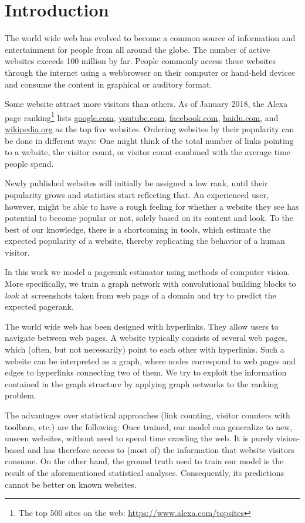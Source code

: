 \section{Introduction}
\label{section:introduction}

The world wide web has evolved to become a common source of information and entertainment for people from all around the globe. The number of active websites exceeds 100 million by far. People commonly access these websites through the internet using a webbrowser on their computer or hand-held devices and consume the content in graphical or auditory format.

Some website attract more visitors than others. As of January 2018, the Alexa page ranking\footnote{The top 500 sites on the web: \url{https://www.alexa.com/topsites}} lists \url{google.com}, \url{youtube.com}, \url{facebook.com}, \url{baidu.com}, and \url{wikipedia.org} as the top five websites. Ordering websites by their popularity can be done in different ways: One might think of the total number of links pointing to a website, the visitor count, or visitor count combined with the average time people spend.

Newly published websites will initially be assigned a low rank, until their popularity grows and statistics start reflecting that. An experienced user, however, might be able to have a rough feeling for whether a website they see has potential to become popular or not, solely based on its content and look. To the best of our knowledge, there is a shortcoming in tools, which estimate the expected popularity of a website, thereby replicating the behavior of a human visitor.

In this work we model a pagerank estimator using methods of computer vision. More specifically, we train a graph network with convolutional building blocks to \textit{look} at screenshots taken from web page of a domain and try to predict the expected pagerank.

The world wide web has been designed with hyperlinks. They allow users to navigate between web pages. A website typically consists of several web pages, which (often, but not necessarily) point to each other with hyperlinks. Such a website can be interpreted as a graph, where nodes correspond to web pages and edges to hyperlinks connecting two of them. We try to exploit the information contained in the graph structure by applying graph networks to the ranking problem.

The advantages over statistical approaches (link counting, visitor counters with toolbars, etc.) are the following: Once trained, our model can generalize to new, unseen websites, without need to spend time crawling the web. It is purely vision-based and has therefore access to (most of) the information that website visitors consume. On the other hand, the ground truth used to train our model is the result of the aforementioned statistical analyses. Consequently, its  predictions cannot be better on known websites.

